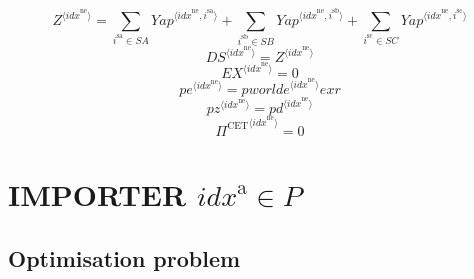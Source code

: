 \begin{equation}
{Z}^{\langle {i\!d\!x}^{\mathrm{ne}}\rangle} = \sum_{i^{\mathrm{sa}}\in {S\!A}} {{Y\!a\!p}}^{\langle {i\!d\!x}^{\mathrm{ne}},i^{\mathrm{sa}}\rangle} + \sum_{i^{\mathrm{sb}}\in {S\!B}} {{Y\!a\!p}}^{\langle {i\!d\!x}^{\mathrm{ne}},i^{\mathrm{sb}}\rangle} + \sum_{i^{\mathrm{sc}}\in {S\!C}} {{Y\!a\!p}}^{\langle {i\!d\!x}^{\mathrm{ne}},i^{\mathrm{sc}}\rangle}
\end{equation}
\begin{equation}
{{D\!S}}^{\langle {i\!d\!x}^{\mathrm{ne}}\rangle} = {Z}^{\langle {i\!d\!x}^{\mathrm{ne}}\rangle}
\end{equation}
\begin{equation}
{{E\!X}}^{\langle {i\!d\!x}^{\mathrm{ne}}\rangle} = 0
\end{equation}
\begin{equation}
{{p\!e}}^{\langle {i\!d\!x}^{\mathrm{ne}}\rangle} = {{{p\!w\!o\!r\!l\!d\!e}}^{\langle {i\!d\!x}^{\mathrm{ne}}\rangle}} {{e\!x\!r}}
\end{equation}
\begin{equation}
{{p\!z}}^{\langle {i\!d\!x}^{\mathrm{ne}}\rangle} = {{p\!d}}^{\langle {i\!d\!x}^{\mathrm{ne}}\rangle}
\end{equation}
\begin{equation}
{\Pi^{\mathrm{CET}}}^{\langle {i\!d\!x}^{\mathrm{ne}}\rangle} = 0
\end{equation}




\section{IMPORTER ${i\!d\!x}^{\mathrm{a}}\in P$}

\subsection{Optimisation problem}

